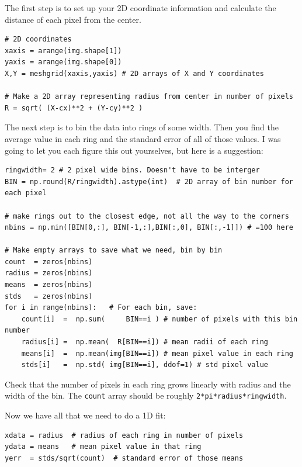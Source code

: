 \documentclass[11pt]{hmcpset}
\begin{document}
\begin{problem}
	The first step is to set up your 2D coordinate information and calculate the distance of each pixel from the center.
\begin{lstlisting}[style=Python]
# 2D coordinates
xaxis = arange(img.shape[1])
yaxis = arange(img.shape[0])
X,Y = meshgrid(xaxis,yaxis) # 2D arrays of X and Y coordinates

# Make a 2D array representing radius from center in number of pixels
R = sqrt( (X-cx)**2 + (Y-cy)**2 ) 
\end{lstlisting}
\end{problem}
\pagebreak







\begin{problem}

The next step is to bin the data into rings of some width. Then you find the average value in each ring and the standard error of all of those values. I was going to let you each figure this out yourselves, but here is a suggestion:
\begin{lstlisting}[style=Python]
ringwidth= 2 # 2 pixel wide bins. Doesn't have to be interger
BIN = np.round(R/ringwidth).astype(int)  # 2D array of bin number for each pixel

# make rings out to the closest edge, not all the way to the corners
nbins = np.min([BIN[0,:], BIN[-1,:],BIN[:,0], BIN[:,-1]]) # =100 here

# Make empty arrays to save what we need, bin by bin
count  = zeros(nbins)
radius = zeros(nbins)
means  = zeros(nbins)
stds   = zeros(nbins)
for i in range(nbins):   # For each bin, save:
	count[i]  =  np.sum(     BIN==i ) # number of pixels with this bin number
	radius[i] =  np.mean(  R[BIN==i]) # mean radii of each ring
	means[i]  =  np.mean(img[BIN==i]) # mean pixel value in each ring
	stds[i]   =  np.std( img[BIN==i], ddof=1) # std pixel value
\end{lstlisting}

Check that the number of pixels in each ring grows linearly with radius and the width of the bin. The \texttt{count} array should be roughly \texttt{2*pi*radius*ringwidth}.

Now we have all that we need to do a 1D fit:

\begin{lstlisting}[style=Python]
xdata = radius  # radius of each ring in number of pixels
ydata = means   # mean pixel value in that ring
yerr  = stds/sqrt(count)  # standard error of those means
\end{lstlisting}


\end{problem}
\end{document}
